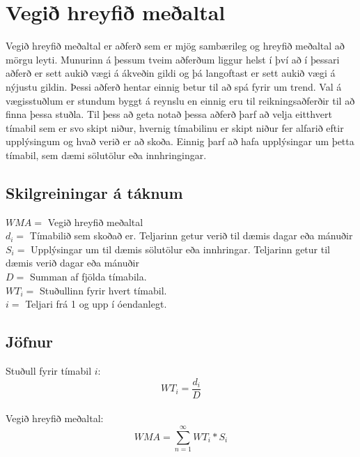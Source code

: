 \section {Vegið hreyfið meðaltal}

Vegið hreyfið meðaltal \cite{WMA} er aðferð sem er mjög sambærileg og hreyfið meðaltal að mörgu leyti. Munurinn á þessum tveim aðferðum liggur helst í því að í þessari aðferð er sett aukið vægi á ákveðin gildi og þá langoftast er sett aukið vægi á nýjustu gildin. Þessi aðferð hentar einnig betur til að spá fyrir um trend. Val á vægisstuðlum er stundum byggt á reynslu en einnig eru til reikningsaðferðir til að finna þessa stuðla. Til þess að geta notað þessa aðferð þarf að velja eitthvert tímabil sem er svo skipt niður, hvernig tímabilinu er skipt niður fer alfarið eftir upplýsingum og hvað verið er að skoða. Einnig þarf að hafa upplýsingar um þetta tímabil, sem dæmi sölutölur eða innhringingar.

\subsection{Skilgreiningar á táknum}


	$WMA =$ Vegið hreyfið meðaltal \\
	$d_i =$ Tímabilið sem skoðað er. Teljarinn getur verið til dæmis dagar eða mánuðir \\
	$S_i =$ Upplýsingar um til dæmis sölutölur eða innhringar. Teljarinn getur til dæmis verið dagar eða mánuðir \\
	$D =$ Summan af fjölda tímabila. \\
	$WT_i =$ Stuðullinn fyrir hvert tímabil. \\
	$i =$ Teljari frá 1 og upp í óendanlegt. \\


\subsection{Jöfnur}

Stuðull fyrir tímabil $i$:
	$$WT_i = \frac{d_i}{D} $$ \\

\noindent Vegið hreyfið meðaltal:
	$$WMA = \sum_{n=1}^{\infty}WT_i*S_i$$ \\
